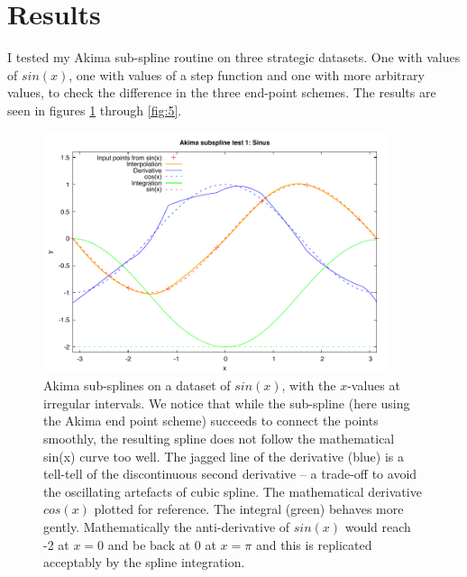 \documentclass[a4paper]{article}
\begin{document}
\section{Results}
I tested my Akima sub-spline routine on three strategic datasets. One with values of $sin(x)$, one with values of a step function and one with more arbitrary values, to check the difference in the three end-point schemes. The results are seen in figures \ref{fig:1} through \ref{fig:5}.

\begin{figure}
    \centering
    \includegraphics[width=0.9\textwidth]{fig/akima_spline_sin.pdf}
    \caption{Akima sub-splines on a dataset of $sin (x)$, with the $x$-values at irregular intervals. We notice that while the sub-spline (here using the Akima end point scheme) succeeds to connect the points smoothly, the resulting spline does not follow the mathematical sin(x) curve too well. The jagged line of the derivative (blue) is a tell-tell of the discontinuous second derivative – a trade-off to avoid the oscillating artefacts of cubic spline. The mathematical derivative $cos(x)$ plotted for reference. The integral (green) behaves more gently. Mathematically the anti-derivative of $sin(x)$ would reach -2 at $x=0$ and be back at $0$ at $x =\pi$ and this is replicated acceptably by the spline integration.}
    \label{fig:1}
\end{figure}
\end{document}
